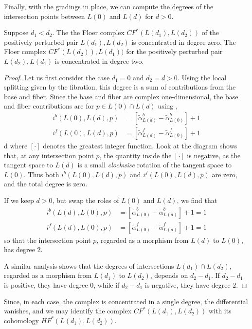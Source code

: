 \documentclass[12pt]{amsart}
\begin{document}
Finally, with the gradings in place, we can compute the degrees of the intersection points between $L(0)$ and $L(d)$ for $d > 0$. 

\begin{proposition}
 Suppose $d_1 < d_2$. The the Floer complex $CF^*(L(d_1),L(d_2))$ of the positively perturbed pair $L(d_1), L(d_2)$ is concentrated in degree zero. The Floer complex $CF^*(L(d_2)), L(d_1))$ for the positively perturbed pair $L(d_2),L(d_1)$ is concentrated in degree two. 
\end{proposition}

\begin{proof}
Let us first consider the case $d_1 = 0$ and $d_2 = d > 0$.
Using the local splitting given by the fibration, this degree is a sum of contributions from the base and fiber. Since the base and fiber are complex one-dimensional, the base and fiber contributions are for $p \in L(0) \cap L(d)$ using \cite[Eq. 11.35]{seidel-book},
\begin{align}
  i^b(L(0),L(d),p) & = [\tilde{\alpha}^b_{L(d)}-\tilde{\alpha}^b_{L(0)}]+1\\
 i^f(L(0),L(d),p) & = [\tilde{\alpha}^f_{L(d)} - \tilde{\alpha}^f_{L(0)}]+1
\end{align}d
where $[\cdot]$ denotes the greatest integer function. Look at the diagram shows that, at any intersection point $p$, the quantity inside the $[\cdot]$ is negative, as the tangent space to $L(d)$ is a small \emph{clockwise} rotation of the tangent space to $L(0)$. Thus both $i^b(L(0),L(d),p)$ and $i^f(L(0),L(d),p)$ are zero, and the total degree is zero.

If we keep $d > 0$, but swap the roles of $L(0)$ and $L(d)$, we find that
\begin{align}
  i^b(L(d),L(0),p) & = [\tilde{\alpha}^b_{L(0)}-\tilde{\alpha}^b_{L(d)}]+1 = 1\\
  i^f(L(d),L(0),p) & = [\tilde{\alpha}^f_{L(0)} - \tilde{\alpha}^f_{L(d)}]+1 = 1
\end{align}
so that the intersection point $p$, regarded as a morphism from $L(d)$ to $L(0)$, has degree 2.

A similar analysis shows that the degrees of intersections $L(d_1)\cap L(d_2)$, regarded as a morphism from $L(d_1)$ to $L(d_2)$, depends on $d_2 - d_1$. If $d_2 - d_1$ is positive, they have degree $0$, while if $d_2 - d_1$ is negative, they have degree $2$.
\end{proof}

Since, in each case, the complex is concentrated in a single degree, the differential vanishes, and we may identify the complex $CF^*(L(d_1),L(d_2))$ with its cohomology $HF^*(L(d_1),L(d_2))$.
\end{document}
